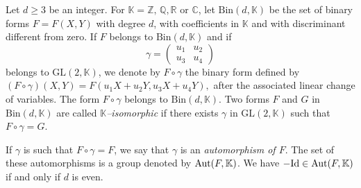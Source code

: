 \documentclass[10pt]{article}
\theoremstyle{definition}
\numberwithin{equation}{section}
\newcommand {\Q}{{\mathbb{Q}}}
\newcommand {\C}{{\mathbb{C}}}
\newcommand {\R}{{\mathbb{R}}}
\newcommand {\Z}{{\mathbb{Z}}}
\newcommand {\K}{{\mathbb{K}}}
\newcommand{\Bin}{\mathrm {Bin}}
\newcommand{\GL}{\mathrm {GL}}
\begin{document}
 Let $d\geqslant 3$ be an integer. For $\K = \Z,\, \Q, \R$ or $\C$, let $\Bin  (d, \K)$ be the set of binary forms
 $F= F(X,Y)$ with degree $d$, with coefficients in $\K$ and with discriminant different from zero. If $F$ belongs to 
 $\Bin (d, \K)$ and if \begin{equation}\label{abcd}
 \gamma= \begin{pmatrix} u_1& u_2 \\ u_3 &u_4\end{pmatrix}
\end{equation}
 belongs to ${\GL}(2, \K)$, we denote by
 $F\circ \gamma$ the binary form defined by 
 $(F\circ \gamma) (X, Y) = F(u_1X+u_2Y, u_3X+u_4Y),
 $
 after the associated linear change of variables. The form $F\circ \gamma$ belongs to $\Bin  (d, \K)$. 
 Two forms $F$ and $G$ in $\Bin  (d, \K)$ are called {\em $\K$--isomorphic} if there exists $\gamma$ in ${\GL}(2, \K)$ such that $F\circ \gamma=G$.
 
 If $\gamma$ is such that $F\circ \gamma =F$, we say that $\gamma$ is an {\em automorphism of $F$}. The set of these automorphisms is a group denoted by ${\rm Aut}(F, \K)$.
 We have $-{\rm Id}\in {\rm Aut}(F, \K)$ if and only if $d$ is even.
 
\end{document}
